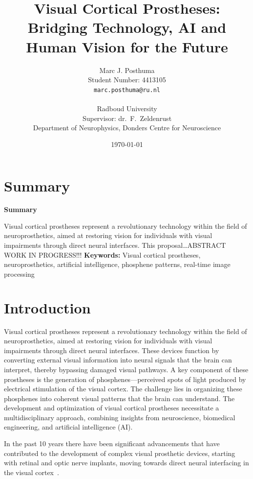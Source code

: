 \documentclass[10pt]{article}
\title{Visual Cortical Prostheses: Bridging Technology, AI and Human Vision for the Future}
\author{
  Marc J. Posthuma\\
  Student Number: 4413105\\
  \texttt{marc.posthuma@ru.nl}\\
  \\
  Radboud University\\
  Supervisor: dr.\ F.\ Zeldenrust\\
  Department of Neurophysics, Donders Centre for Neuroscience
}
\date{\today}
\makeatletter
\renewenvironment{abstract}{%
    \if@twocolumn%
      \section*{\abstractname}%
    \else
      \begin{center}%
        {\bfseries \large\abstractname\vspace{-.5em}\vspace{\z@}}%
      \end{center}%
      \quotation\small %
    \fi}
    {\if@twocolumn\else\endquotation\fi}%
\renewcommand{\abstractname}{Summary}
\makeatother
\begin{document}
\pagestyle{plain}%
\listoftodos%
\clearpage%

\newpage%

\maketitle
\thispagestyle{firstpage} %
\begin{abstract}
  \noindent Visual cortical prostheses represent a revolutionary technology
  within the field of neuro\-prosthetics, aimed at restoring vision for
  individuals with visual impairments through direct neural interfaces. This
  proposal\ldots ABSTRACT WORK IN PROGRESS!!!
\end{abstract}
\textbf{Keywords:} Visual cortical prostheses, neuroprosthetics, artificial intelligence, phosphene patterns, real-time image processing
\vspace{1cm}

\thispagestyle{firstpage}
\section*{Introduction}\label{sec:intro}
Visual cortical prostheses represent a revolutionary technology within the field
of neuroprosthetics, aimed at restoring vision for individuals with visual
impairments through direct neural interfaces. These devices function by
converting external visual information into neural signals that the brain can
interpret, thereby bypassing damaged visual pathways. A key component of these
prostheses is the generation of phosphenes—perceived spots of light produced by
electrical stimulation of the visual cortex. The challenge lies in organizing
these phosphenes into coherent visual patterns that the brain can understand.
The development and optimization of visual cortical prostheses necessitate a
multidisciplinary approach, combining insights from neuroscience, biomedical
engineering, and artificial intelligence (AI).

In the past 10 years there have been significant advancements that have
contributed to the development of complex visual prosthetic devices, starting
with retinal and optic nerve implants, moving towards direct neural interfacing
in the visual
cortex~\parencite{deruytervansteveninckRealworldIndoorMobility2022}.
\end{document}
